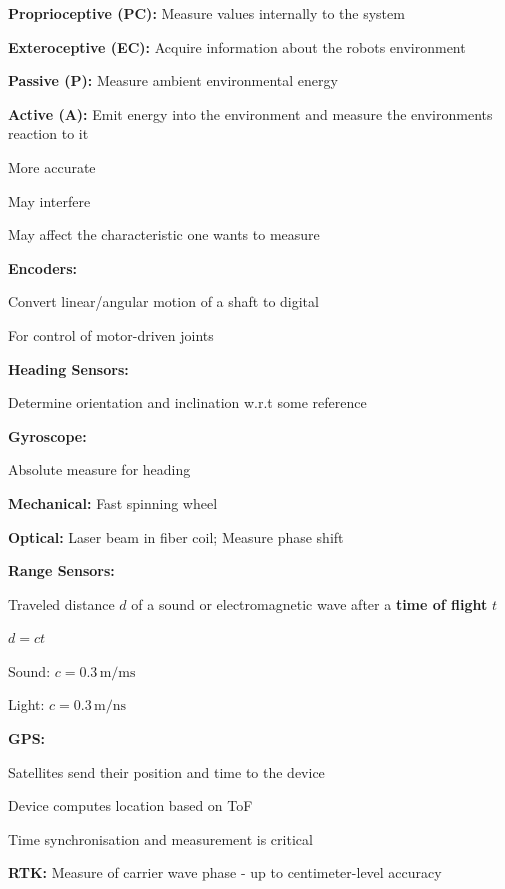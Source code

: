 \documentclass[a4paper]{article}
\newcommand{\ipro}{\item[+]}
\newcommand{\icon}{\item[-]}
\newcommand{\ides}[1]{\item \textbf{#1}}
\begin{document}
\begin{itemize}
    \ides{Proprioceptive (PC):} Measure values internally to the system
    \ides{Exteroceptive (EC):} Acquire information about the robots environment
    \ides{Passive (P):} Measure ambient environmental energy
    \ides{Active (A):} Emit energy into the environment and measure the environments reaction to it
        \begin{itemize*}
            \ipro More accurate
            \icon May interfere
            \icon May affect the characteristic one wants to measure
        \end{itemize*}
    \ides{Encoders:}
        \begin{itemize*}
            \item Convert linear/angular motion of a shaft to digital
            \item For control of motor-driven joints
        \end{itemize*}
    \ides{Heading Sensors:}
        \begin{itemize*}
            \item Determine orientation and inclination w.r.t some reference
            \ides{Gyroscope:}
                \begin{itemize*}
                    \item Absolute measure for heading
                    \ides{Mechanical:} Fast spinning wheel
                    \ides{Optical:} Laser beam in fiber coil; Measure phase shift
                \end{itemize*}
        \end{itemize*}
    \ides{Range Sensors:}
        \begin{itemize*}
            \item Traveled distance $d$ of a sound or electromagnetic wave after a \textbf{time of flight} $t$
            \item $d=ct$
            \item Sound: $c = 0.3\,\mathrm m / \mathrm{ms}$
            \item Light: $c = 0.3\,\mathrm m / \mathrm{ns}$
        \end{itemize*}
    \ides{GPS:}
        \begin{itemize*}
            \item Satellites send their position and time to the device
            \item Device computes location based on ToF
            \item Time synchronisation and measurement is critical
            \ides{RTK:} Measure of carrier wave phase - up to centimeter-level accuracy
        \end{itemize*}
\end{itemize}
\end{document}
